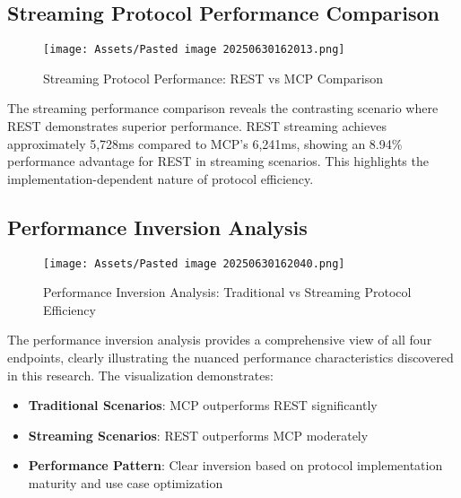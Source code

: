 \subsection{Streaming Protocol Performance Comparison}


\begin{figure}[h]
\centering
\texttt{[image: Assets/Pasted image 20250630162013.png]}
\caption{Streaming Protocol Performance: REST vs MCP Comparison}
\label{fig:streaming_performance_comparison}
\end{figure}

The streaming performance comparison reveals the contrasting scenario where REST demonstrates superior performance. REST streaming achieves approximately 5,728ms compared to MCP's 6,241ms, showing an 8.94\% performance advantage for REST in streaming scenarios. This highlights the implementation-dependent nature of protocol efficiency.

\subsection{Performance Inversion Analysis}


\begin{figure}[h]
\centering
\texttt{[image: Assets/Pasted image 20250630162040.png]}
\caption{Performance Inversion Analysis: Traditional vs Streaming Protocol Efficiency}
\label{fig:performance_inversion_analysis}
\end{figure}

The performance inversion analysis provides a comprehensive view of all four endpoints, clearly illustrating the nuanced performance characteristics discovered in this research. The visualization demonstrates:

\begin{itemize}
    \item \textbf{Traditional Scenarios}: MCP outperforms REST significantly
    \item \textbf{Streaming Scenarios}: REST outperforms MCP moderately
    \item \textbf{Performance Pattern}: Clear inversion based on protocol implementation maturity and use case optimization
\end{itemize}

